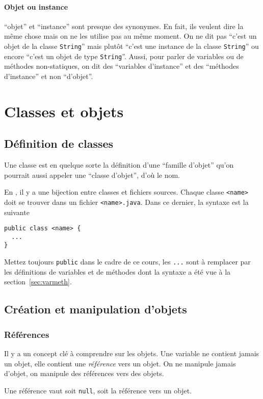 \paragraph{Objet ou instance}
``objet'' et ``instance'' sont presque des synonymes.
En fait, ils veulent dire la même chose mais on ne les utilise pas au
même moment.
On ne dit pas ``c'est un objet de la classe \lstinline|String|'' mais plutôt
``c'est une instance de la classe \lstinline|String|'' ou encore
``c'est un objet de type \lstinline|String|''.
Aussi, pour parler de variables ou de méthodes non-statiques,
on dit des ``variables d'instance'' et des ``méthodes d'instance'' et non
``d'objet''.

\section{Classes et objets}
\subsection{Définition de classes}
Une classe est en quelque sorte la définition d'une ``famille d'objet''
qu'on pourrait aussi appeler une ``classe d'objet'', d'où le nom.

En \java{}, il y a une bijection entre classes et fichiers sources.
Chaque classe \lstinline{<name>} doit
se trouver dans un fichier \lstinline{<name>.java}.
Dans ce dernier, la syntaxe est la suivante
\begin{lstlisting}
public class <name> {
  ...
}
\end{lstlisting}

Mettez toujours \lstinline{public} dans le cadre de ce cours,
les \lstinline{...} sont à remplacer par les définitions
de variables et de méthodes
dont la syntaxe a été vue à la section~\ref{sec:varmeth}.

\subsection{Création et manipulation d'objets}
\subsubsection{Références}
Il y a un concept clé à comprendre sur les objets.
Une variable ne contient jamais un objet,
elle contient une \emph{référence} vers un objet.
On ne manipule jamais d'objet,
on manipule des références vers des objets.

Une référence vaut soit \lstinline{null}, soit la référence vers
un objet.

